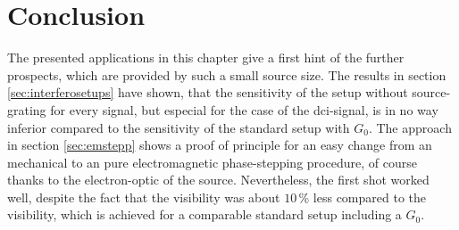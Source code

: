 \section{Conclusion}\label{sec:conclusionappl}
The presented applications in this chapter give a first hint of the further prospects, which are provided by such a small source size. The results in section \ref{sec:interferosetups} have shown, that the sensitivity of the setup without source-grating for every signal, but especial for the case of the \gls{dci}-signal, is in no way inferior compared to the sensitivity of the standard setup with $G_{0}$. The approach in section \ref{sec:emstepp} shows a proof of principle for an easy change from an mechanical to an pure electromagnetic phase-stepping procedure, of course thanks to the electron-optic of the source. Nevertheless, the first shot worked well, despite the fact that the visibility was about $10\,$\% less compared to the visibility, which is achieved for a comparable standard setup including a $G_{0}$.  



